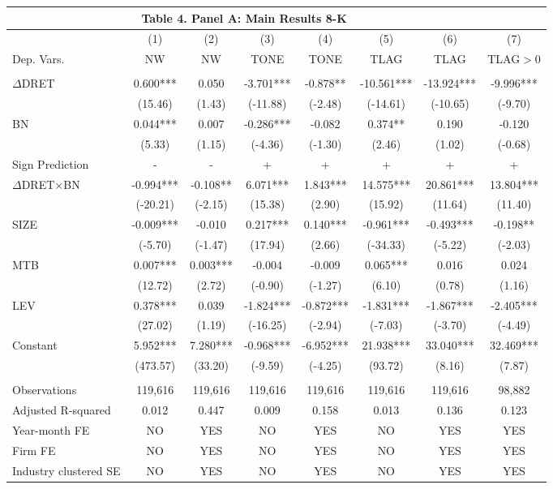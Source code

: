 \begin{table}[htbp] \label{T4PA}
  \centering
    \begin{tabular}{lccccccc}
    \multicolumn{7}{c}{\textbf{Table 4. Panel A: Main Results 8-K}} \\
    \midrule
    \midrule
      & (1) & (2) & (3) & (4) & (5) & (6) & (7)\\
    Dep. Vars. & NW & NW & TONE & TONE & TLAG & TLAG & TLAG$>$0\\
    \midrule
      &   &   &   &   &   &  &  \\
    $\Delta$DRET & 0.600*** & 0.050 & -3.701*** & -0.878** & -10.561*** & -13.924*** & -9.996*** \\
      & (15.46) & (1.43) & (-11.88) & (-2.48) & (-14.61) & (-10.65) & (-9.70) \\
    BN & 0.044*** & 0.007 & -0.286*** & -0.082 & 0.374** & 0.190 & -0.120 \\
      & (5.33) & (1.15) & (-4.36) & (-1.30) & (2.46) & (1.02) & (-0.68) \\
    \rowcolor[rgb]{ .933,  .925,  .882} Sign Prediction & - & - & + & + & + & + & + \\
    \rowcolor[rgb]{ .933,  .925,  .882} $\Delta$DRET$\times$BN & -0.994*** & -0.108** & 6.071*** & 1.843*** & 14.575*** & 20.861*** & 13.804*** \\
    \rowcolor[rgb]{ .933,  .925,  .882}   & (-20.21) & (-2.15) & (15.38) & (2.90) & (15.92) & (11.64) & (11.40) \\
    SIZE & -0.009*** & -0.010 & 0.217*** & 0.140*** & -0.961*** & -0.493*** & -0.198** \\
      & (-5.70) & (-1.47) & (17.94) & (2.66) & (-34.33) & (-5.22) & (-2.03) \\
    MTB & 0.007*** & 0.003*** & -0.004 & -0.009 & 0.065*** & 0.016 & 0.024 \\
      & (12.72) & (2.72) & (-0.90) & (-1.27) & (6.10) & (0.78) & (1.16) \\
    LEV & 0.378*** & 0.039 & -1.824*** & -0.872*** & -1.831*** & -1.867*** & -2.405*** \\
      & (27.02) & (1.19) & (-16.25) & (-2.94) & (-7.03) & (-3.70) & (-4.49) \\
    Constant & 5.952*** & 7.280*** & -0.968*** & -6.952*** & 21.938*** & 33.040*** & 32.469*** \\
      & (473.57) & (33.20) & (-9.59) & (-4.25) & (93.72) & (8.16) & (7.87) \\
      &   &   &   &   &   &  &  \\
    Observations & 119,616 & 119,616 & 119,616 & 119,616 & 119,616 & 119,616 & 98,882 \\
    Adjusted R-squared & 0.012 & 0.447 & 0.009 & 0.158 & 0.013 & 0.136 & 0.123 \\
    Year-month FE & NO & YES & NO & YES & NO & YES & YES \\
    Firm FE & NO & YES & NO & YES & NO & YES & YES \\
    Industry clustered SE & NO & YES & NO & YES & NO & YES & YES \\
    \bottomrule
    \bottomrule
    \end{tabular}%
\end{table}%

